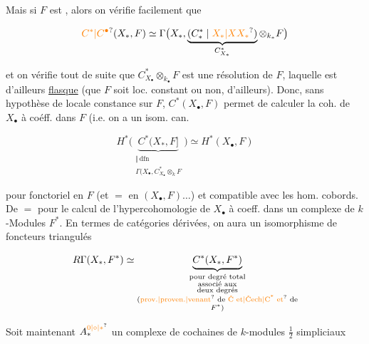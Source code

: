 
Mais si $F$  est  , alors on vérifie facilement que

\[
\unsure{C^{*}|C^{\bullet}}(X_*,F)\simeq\Gamma\bigl(X_*,\underbrace{(C^{*}_{*}\mid\unsure{X_{*}|XX_{*}})}_{C^{*}_{X_*}}\otimes_{k_*}F\bigr)
\]


et on vérifie tout de suite que $C^{*}_{X_\bullet}\otimes_{k_\bullet}F$ est une résolution de $F$, laquelle est d'ailleurs \uline{flasque}  (que $F$ soit loc. constant ou non, d'ailleurs). Donc, sans hypothèse de locale constance sur $F$, $C^{*}(X_\bullet,F)$ permet de calculer la coh. de $X_\bullet$ à coéff. dans $F$ (i.e. on a un isom. can.

\[
H^{*}\bigl(\underbrace{C^{*}(X_*,F]}_{\substack{\Vert\,\mathrm{dfn}\\\Gamma(X_\bullet,C^{*}_{X_\bullet}\otimes_k F}}\bigr)\simeq H^{*}(X_\bullet,F)
\]

pour  fonctoriel en $F$ (et $=$ en $(X_\bullet,F)\ldots$) et compatible avec les hom. cobords. De $=$ pour le calcul de l'hypercohomologie de $X_\bullet$ à coeff. dans un complexe de $k$-Modules $F^{*}$. En termes de catégories dérivées, on aura un isomorphisme de foncteurs triangulés

\[
R\Gamma(X_*,F^*)\simeq\underbrace{C^{*}(X_*,F^*)}_{\substack{\text{pour degré total}\\\text{associé aux}\\\text{deux degrés}\\\text{(\unsure{prov.|proven.|venant} de \unsure{\v{C} et|\v{C}ech|C\textsuperscript{*} et} de}\\ F^{*}\text{)}}}
\]


Soit maintenant $A_*^{\unsure{0|\circ|*}}$ un  complexe de cochaines de $k$-modules $\frac{1}{2}$ simpliciaux

